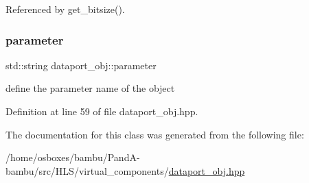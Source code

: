 Referenced by get\+\_\+bitsize().

\mbox{\label{classdataport__obj_ae3a418c8affac21e96b6bd4a42f40e94}} 
\subsubsection{\texorpdfstring{parameter}{parameter}}
{\footnotesize\ttfamily std\+::string dataport\+\_\+obj\+::parameter\hspace{0.3cm}{\ttfamily [private]}}



define the parameter name of the object 



Definition at line 59 of file dataport\+\_\+obj.\+hpp.



The documentation for this class was generated from the following file\+:\begin{DoxyCompactItemize}
\item 
/home/osboxes/bambu/\+Pand\+A-\/bambu/src/\+H\+L\+S/virtual\+\_\+components/\hyperlink{dataport__obj_8hpp}{dataport\+\_\+obj.\+hpp}\end{DoxyCompactItemize}
